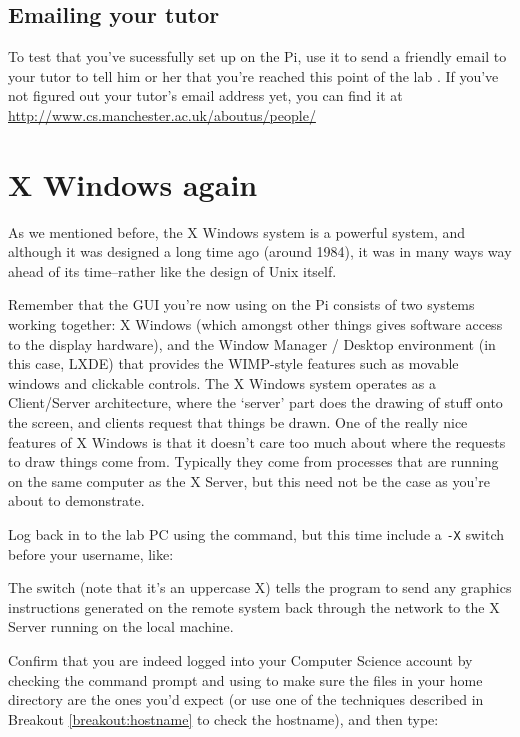 \subsection{Emailing your tutor}

To test that you've sucessfully set  up on the Pi, use it to send a friendly email to your tutor to tell him or her that you're reached this point of the lab . If you've not figured out your tutor's email address yet, you can find it at
\\
\url{http://www.cs.manchester.ac.uk/aboutus/people/}

\section{X Windows again}

As we mentioned before, the X Windows system is a powerful system, and although it was designed a long time ago (around 1984), it was in many ways way ahead of its time--rather like the design of Unix itself.

Remember that the GUI you're now using on the Pi consists of two systems working together: X Windows (which amongst other things gives software access to the display hardware), and the Window Manager / Desktop environment (in this case, LXDE) that provides the WIMP-style features such as movable windows and clickable controls. The X Windows system operates as a Client/Server architecture, where the `server' part does the drawing of stuff onto the screen, and clients request that things be drawn. One of the really nice features of X Windows is that it doesn't care too much about where the requests to draw things come from. Typically they come from processes that are running on the same computer as the X Server, but this need not be the case as you're about to demonstrate.

Log back in to the lab PC using the  command, but this time include a \texttt{-X} switch before your username, like:


The  switch (note that it's an uppercase X) tells the  program to send any graphics instructions generated on the remote system back through the network to the X Server running on the local machine.

Confirm that you are indeed logged into your Computer Science account by checking the command prompt and using  to make sure the files in your home directory are the ones you'd expect (or use one of the techniques described in Breakout \ref{breakout:hostname} to check the hostname), and then type:

